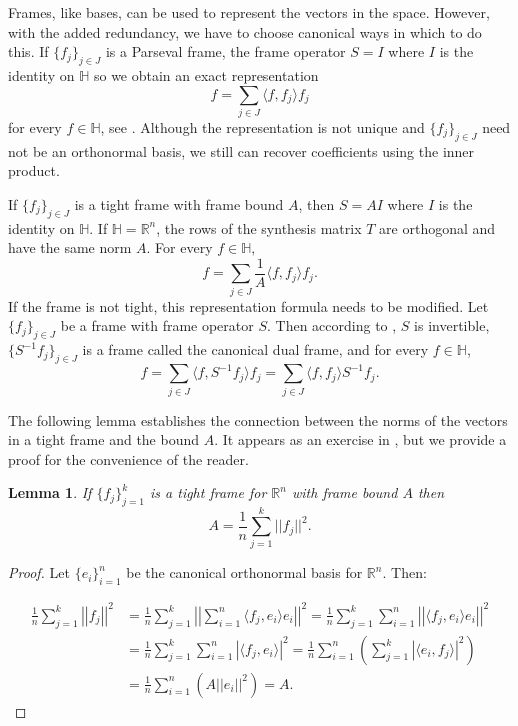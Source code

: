 \documentclass[11pt, reqno]{amsart}
\renewcommand{\H}{\mathbb{H}}
\providecommand{\R}{\mathbb R}
\newcommand{\norm}[1]{\left|\left| #1 \right|\right|}
\newtheorem{lemma}[theorem]{Lemma}
\numberwithin{equation}{section}
\begin{document}
Frames, like bases, can be used to represent the vectors in the space.  However, with the added redundancy, we have to choose canonical ways in which to do this. If  $\{f_j\}_{j \in J}$ is  a Parseval frame, the frame operator $S=I$ where $I$ is the identity on $\mathbb{H}$ so we obtain an exact representation $$f=\sum_{j \in J}\langle f, f_j\rangle f_j$$ for every $f\in \mathbb{H}$, see \cite[Section 3.2]{Han}. Although the representation is not unique and $\{f_j\}_{j \in J}$ need not be an orthonormal basis, we still can recover coefficients using the inner product. 

If  $\{f_j\}_{j \in J}$ is a tight frame with frame bound $A$, then $S=AI$ where $I$ is the identity on $\mathbb{H}$. If $ \H=\R^n$,  the rows of the synthesis matrix $T$ are orthogonal and have the same norm $A$. For every $f\in \mathbb{H},$ $$f=\sum_{j \in J}\frac{1}{A}\langle f, f_j\rangle f_j.
$$
%
\noindent If the frame is not tight,  this representation formula needs to be modified. 
  Let  $\{f_j\}_{j \in J}$  be a frame with frame operator $S$. Then according to \cite[Section 6.1]{Han}, $S$ is invertible, $\{S^{-1}f_j\}_{j \in J}$ is a frame called the canonical dual frame, and for every $f\in \mathbb{H}$, 
  \begin{equation}\label{repr-formula}
  	f= \sum_{j \in J}\langle f, S^{-1}f_j\rangle f_j= \sum_{j \in J}\langle f, f_j\rangle S^{-1}f_j.\end{equation}

 The following lemma establishes the connection between the norms of  the vectors in a tight frame and the bound $A$. 
	It appears as an exercise in \cite{Han}, %
	but we provide a proof for the convenience of the reader.

\begin{lemma}\label{lem: TightFrameBound}
	If $\{f_j\}_{j=1}^k$ is a tight frame for $\R^n$ with frame bound $A$ then $$A=\frac{1}{n} \sum_{j=1}^{k} ||f_j||^2.$$
\end{lemma}

\begin{proof}
	Let $\{e_i\}_{i=1}^n$ be the canonical orthonormal basis for $\R^n$. Then:
	
	\begin{align*}
		\frac{1}{n} \sum_{j=1}^k \norm{f_j}^2 
  &= \frac{1}{n} \sum_{j=1}^k \norm{ \sum_{i=1}^n \langle f_j,e_i \rangle e_i }^2
		= \frac{1}{n} \sum_{j=1}^k \sum_{i=1}^n \norm{ \langle f_j,e_i \rangle e_i }^2  \\
  &= \frac{1}{n} \sum_{j=1}^k \sum_{i=1}^n | \langle f_j,e_i \rangle |^2
  = \frac{1}{n} \sum_{i=1}^n \left( \sum_{j=1}^k | \langle e_i,f_j \rangle |^2 \right)\\
		&= \frac{1}{n} \sum_{i=1}^n \left( A \norm{e_i}^2 \right) = A.
	\end{align*}
	
\end{proof}
\end{document}
